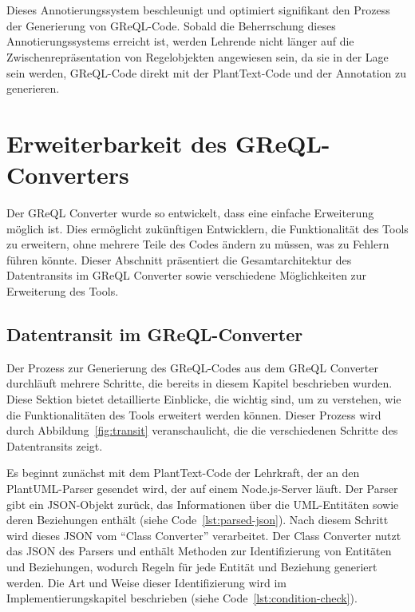 \\~\\
Dieses Annotierungssystem beschleunigt und optimiert signifikant den Prozess der Generierung von GReQL-Code. Sobald
die Beherrschung dieses Annotierungssystems erreicht ist, werden Lehrende nicht länger auf die Zwischenrepräsentation
von Regelobjekten angewiesen sein, da sie in der Lage sein werden, GReQL-Code direkt mit der PlantText-Code und der
Annotation zu generieren.

\section{Erweiterbarkeit des GReQL-Converters}\label{sec:erweiterbarkeit-des-greql-converters}

Der GReQL Converter wurde so entwickelt, dass eine einfache Erweiterung möglich ist. Dies ermöglicht zukünftigen
Entwicklern, die Funktionalität des Tools zu erweitern, ohne mehrere Teile des Codes ändern zu müssen, was zu Fehlern
führen könnte. Dieser Abschnitt präsentiert die Gesamtarchitektur des Datentransits im GReQL Converter sowie
verschiedene Möglichkeiten zur Erweiterung des Tools.

\subsection{Datentransit im GReQL-Converter}\label{subsec:datentransit-im-greql-converter}

Der Prozess zur Generierung des GReQL-Codes aus dem GReQL Converter durchläuft mehrere Schritte, die bereits in diesem
Kapitel beschrieben wurden. Diese Sektion bietet detaillierte Einblicke, die wichtig sind, um zu
verstehen, wie die Funktionalitäten des Tools erweitert werden können. Dieser Prozess wird durch
Abbildung~\ref{fig:transit} veranschaulicht, die die verschiedenen Schritte des Datentransits zeigt.


Es beginnt zunächst mit dem PlantText-Code der Lehrkraft, der an den PlantUML-Parser gesendet wird, der auf einem
Node.js-Server läuft. Der Parser gibt ein JSON-Objekt zurück, das Informationen über die UML-Entitäten sowie deren
Beziehungen enthält (siehe Code~\ref{lst:parsed-json}). Nach diesem Schritt wird dieses JSON vom ``Class Converter''
verarbeitet. Der Class Converter nutzt das JSON des Parsers und enthält Methoden zur Identifizierung von Entitäten und
Beziehungen, wodurch Regeln für jede Entität und Beziehung generiert werden. Die Art und Weise dieser
Identifizierung wird im Implementierungskapitel beschrieben (siehe Code~\ref{lst:condition-check}).


